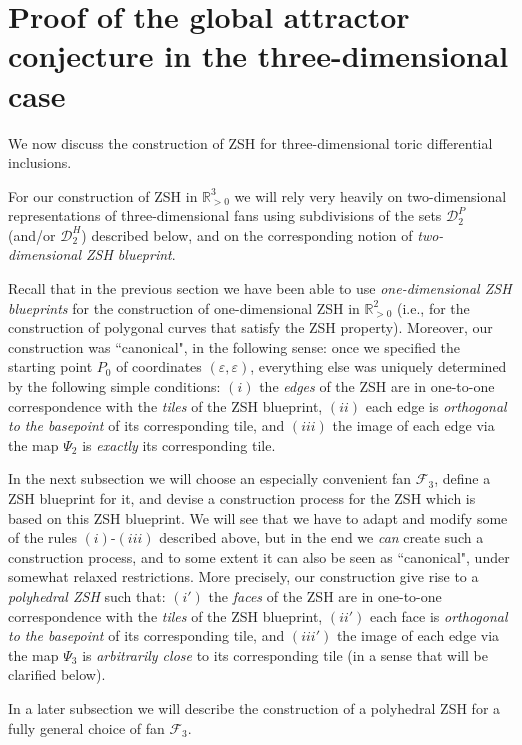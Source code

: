 \documentclass[12pt,letterpaper]{article}
\newcommand{\F}{\mathcal{F}}
\newcommand{\RRp}{\mathbb{R}_{>0}}
\newcommand{\eps}{\varepsilon}
\begin{document}
\newpage 

\section{Proof of the global attractor conjecture in the three-dimensional case}
\label{section:proof_in_3D}

We now discuss the construction of ZSH for three-dimensional toric differential inclusions. 

For our construction of ZSH in $\RRp^3$ we will rely very heavily on two-dimensional representations of three-dimensional fans using subdivisions of the sets $\mathscr{D}_2^P$ (and/or $\mathscr{D}_2^H$) described below, and on the corresponding notion of {\em two-dimensional ZSH blueprint}.

Recall that in the previous section we have been able to use {\em one-dimensional ZSH blueprints} for the construction of one-dimensional ZSH in $\RRp^2$ (i.e., for the construction of polygonal curves that satisfy the ZSH property). Moreover, our construction was ``canonical", in the following sense: once we specified the starting point $P_0$ of coordinates $(\eps, \eps)$, everything else was uniquely determined by the following  simple conditions: $(i)$ the {\em edges} of the ZSH are in one-to-one correspondence with the {\em tiles} of the ZSH blueprint,  $(ii)$ each edge is {\em orthogonal to the basepoint}  of its corresponding tile, and $(iii)$ the image of each edge via the map $\Psi_2$ is {\em exactly} its corresponding tile. 


In the next subsection  we will choose an especially convenient fan $\F_3$,  define a ZSH blueprint for it, and   devise a construction process for the ZSH which is based on this ZSH blueprint. We will see that we have to adapt and modify some of the rules $(i)$-$(iii)$ described above, but in the end we {\em can} create such a construction process, and to some extent it can also be seen as ``canonical", under somewhat relaxed restrictions. More precisely, our construction give rise to a {\em polyhedral ZSH} such that: $(i')$ the {\em faces} of the ZSH are in one-to-one correspondence with the {\em tiles} of the ZSH blueprint, $(ii')$ each face is {\em orthogonal to the basepoint} of its corresponding tile, and $(iii')$ the image of each edge via the map $\Psi_3$ is {\em arbitrarily close} to its corresponding tile (in a sense that will be clarified below). 

In a later subsection we will describe the construction of a polyhedral ZSH for a fully general choice of fan $\F_3$. 
\end{document}
